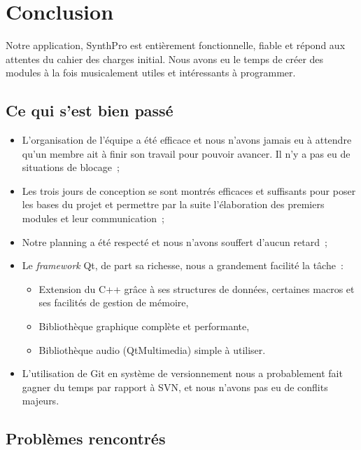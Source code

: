 \section{Conclusion}

Notre application, SynthPro est entièrement fonctionnelle, fiable
et répond aux attentes du cahier des charges initial. Nous avons eu
le temps de créer des modules à la fois musicalement utiles et
intéressants à programmer.

\subsection{Ce qui s'est bien passé}

\begin{itemize}
\item
  L'organisation de l'équipe a été efficace et nous n'avons jamais eu
  à attendre qu'un membre ait à finir son travail pour pouvoir
  avancer. Il n'y a pas eu de situations de blocage~;
\item
  Les trois jours de conception se sont montrés efficaces et
  suffisants pour poser les bases du projet et permettre par la suite
  l'élaboration des premiers modules et leur communication~;
\item
  Notre planning a été respecté et nous n'avons souffert d'aucun
  retard~;
\item
  Le \emph{framework} Qt, de part sa richesse, nous a grandement
  facilité la tâche~:
  \begin{itemize}
  \item
    Extension du C++ grâce à ses structures de données, certaines
    macros et ses facilités de gestion de mémoire,
  \item
    Bibliothèque graphique complète et performante,
  \item
    Bibliothèque audio (QtMultimedia) simple à utiliser.
  \end{itemize}
\item
  L'utilisation de Git en système de versionnement nous a
  probablement fait gagner du temps par rapport à SVN, et nous
  n'avons pas eu de conflits majeurs.
\end{itemize}

\subsection{Problèmes rencontrés}

